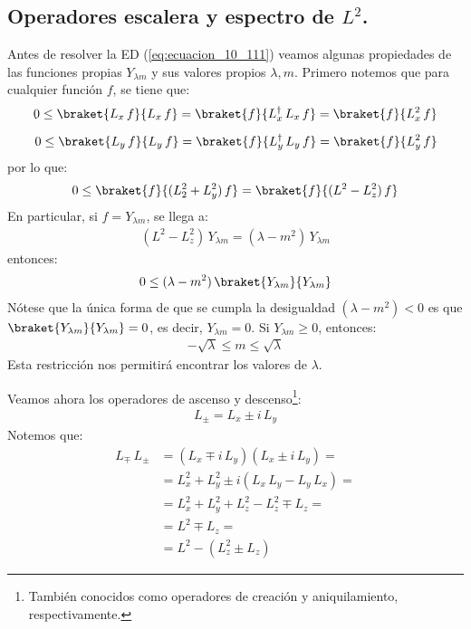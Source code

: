 \subsection{Operadores escalera y espectro de \texorpdfstring{$L^{2}$}{L2}.}

Antes de resolver la ED (\ref{eq:ecuacion_10_111}) veamos algunas propiedades de las funciones propias $Y_{\lambda m}$ y sus valores propios $\lambda, m$. Primero notemos que para cualquier función $f$, se tiene que:
\begin{align*}
0 \leq \braket{L_{x} \, f}{L_{x} \, f} = \braket{f}{L_{x}^{\dagger} \, L_{x} \, f} = \braket{f}{L_{x}^{2} \, f} \\[0.5em]
0 \leq \braket{L_{y} \, f}{L_{y} \, f} = \braket{f}{L_{y}^{\dagger} \, L_{y} \, f} = \braket{f}{L_{y}^{2} \, f}
\end{align*}
por lo que:
\begin{align*}
0 \leq \braket{f}{(L_{2}^{2} + L_{y}^{2}) \, f} = \braket{f}{(L^{2} - L_{z}^{2}) \, f}
\end{align*}
En particular, si $f = Y_{\lambda m}$, se llega a:
\begin{align}
(L^{2} - L_{z}^{2}) \, Y_{\lambda m} = (\lambda - m^{2}) \, Y_{\lambda m}
\label{eq:ecuacion_10_128}
\end{align}
entonces:
\begin{align}
0 \leq (\lambda - m^{2}) \, \braket{Y_{\lambda m}}{Y_{\lambda m}}
\label{eq:ecuacion_10_129}
\end{align}
Nótese que la única forma de que se cumpla la desigualdad $(\lambda - m^{2}) < 0$ es que $\braket{Y_{\lambda m}}{Y_{\lambda m}} = 0$, es decir, $Y_{\lambda m} = 0$. Si $Y_{\lambda m} \geq 0$, entonces:
\begin{align}
- \sqrt{\lambda} \leq m \leq \sqrt{\lambda}
\label{eq:ecuacion_10_130}
\end{align}                                                   
Esta restricción nos permitirá encontrar los valores de $\lambda$.
\par
Veamos ahora los operadores de ascenso y descenso\footnote{También conocidos como operadores de creación y aniquilamiento, respectivamente.}:
\begin{align}
L_{\pm} = L_{x} \pm i \, L_{y}
\label{eq:ecuacion_10_131}
\end{align}
Notemos que:
\begin{align*}
L_{\mp} \, L_{\pm} &= (L_{x} \mp i \, L_{y})(L_{x} \pm i \, L_{y}) = \\[0.5em]
&= L_{x}^{2} + L_{y}^{2} \pm i (L_{x} \,L_{y} - L_{y} \,L_{x}) = \\[0.5em]
&= L_{x}^{2} + L_{y}^{2} + L_{z}^{2} - L_{z}^{2} \mp L_{z} = \\[0.5em]
&= L^{2} \mp L_{z} = \\[0.5em]
&= L^{2} - (L_{z}^{2} \pm L_{z})
\end{align*}
